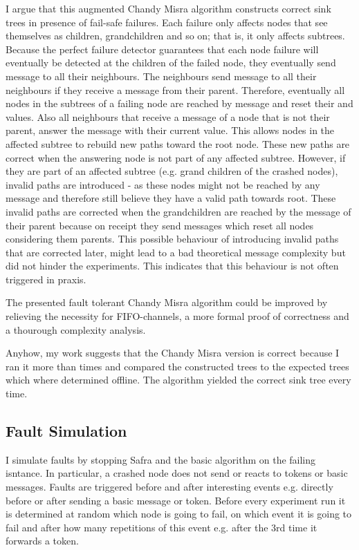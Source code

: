   I argue that this augmented Chandy Misra algorithm constructs correct sink trees in presence of fail-safe failures. 
  Each failure only affects nodes that see themselves as children, grandchildren and so on; that is, it only affects subtrees.
  Because the perfect failure detector guarantees that each node failure will eventually be detected at the children of the failed node, they eventually send  message to all their neighbours.
  The neighbours send  message to all their neighbours if they receive a  message from their parent. 
  Therefore, eventually all nodes in the subtrees of a failing node are reached by  message and reset their  and  values.
  Also all neighbours that receive a  message of a node that is not their parent, answer the  message with their current  value.
  This allows nodes in the affected subtree to rebuild new paths toward the root node.
  These new paths are correct when the answering node is not part of any affected subtree.
  However, if they are part of an affected subtree (e.g. grand children of the crashed nodes), invalid paths are introduced - as these nodes might not be reached by any  message and therefore still believe they have a valid path towards root.
  These invalid paths are corrected when the grandchildren are reached by the  message of their parent because on receipt they send  messages which reset all nodes considering them
  parents. 
  This possible behaviour of introducing invalid paths that are corrected later, might lead to a bad theoretical message complexity but did not hinder the experiments.
  This indicates that this behaviour is not often triggered in praxis.
  
  The presented fault tolerant Chandy Misra algorithm could be improved by relieving the necessity for FIFO-channels, a more formal proof of correctness and a thourough complexity analysis.

  Anyhow, my work suggests that the Chandy Misra version is correct because I ran it more than %
  times and compared the constructed trees to the expected trees which where determined offline. The algorithm yielded the correct sink tree every time.
  
  
  
\subsection{Fault Simulation}
	I simulate faults by stopping Safra and the basic algorithm on the failing isntance.
	In particular, a crashed node does not send or reacts to tokens or basic messages.
	Faults are triggered before and after interesting events e.g. directly before or after sending a basic message or token. 
	Before every experiment run it is determined at random which node is going to fail, on which event it is going to fail and after how many repetitions of this event e.g. after the 3rd time it forwards a token.
	
